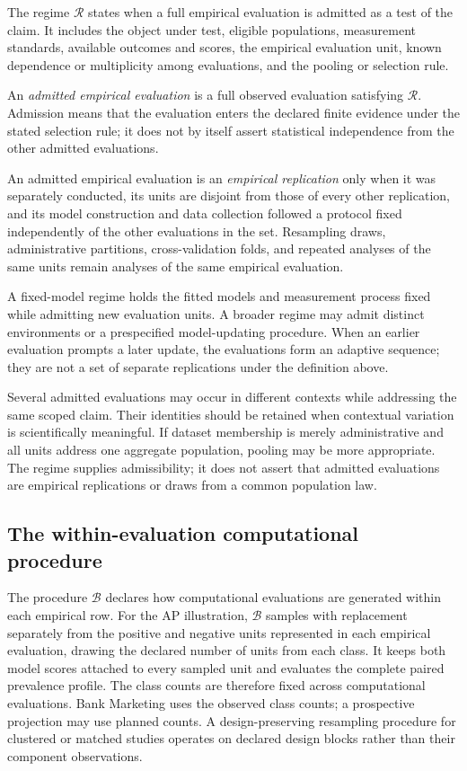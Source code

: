 \documentclass[11pt]{article}
\newcommand{\Regime}{\mathcal{R}}
\newcommand{\Boot}{\mathcal{B}}
\theoremstyle{remark}
\begin{document}
The regime $\Regime$ states when a full empirical evaluation is admitted as a
test of the claim. It includes the object under test, eligible populations,
measurement standards, available outcomes and scores, the empirical
evaluation unit, known dependence or multiplicity among evaluations, and the
pooling or selection rule.

An \emph{admitted empirical evaluation} is a full observed evaluation
satisfying $\Regime$. Admission means that the evaluation enters the declared
finite evidence under the stated selection rule; it does not by itself assert
statistical independence from the other admitted evaluations.

An admitted empirical evaluation is an \emph{empirical replication} only when
it was separately conducted, its units are disjoint from those of every other
replication, and its model construction and data collection followed a protocol
fixed independently of the other evaluations in the set. Resampling draws,
administrative partitions, cross-validation folds, and repeated analyses of the
same units remain analyses of the same empirical evaluation.

A fixed-model regime holds the fitted models and measurement process fixed
while admitting new evaluation units. A broader regime may admit distinct
environments or a prespecified model-updating procedure. When an earlier
evaluation prompts a later update, the evaluations form an adaptive sequence;
they are not a set of separate replications under the definition above.

Several admitted evaluations may occur in different contexts while addressing
the same scoped claim. Their identities should be retained when contextual
variation is scientifically meaningful. If dataset membership is merely
administrative and all units address one aggregate population, pooling may be
more appropriate. The regime supplies admissibility; it does not assert that
admitted evaluations are empirical replications or draws from a common
population law.

\subsection{The within-evaluation computational procedure}

The procedure $\Boot$ declares how computational evaluations are generated
within each empirical row. For the AP illustration, $\Boot$ samples with
replacement separately from the positive and negative units represented in
each empirical evaluation, drawing the declared number of units from each
class. It keeps both model scores attached to every sampled unit and evaluates
the complete paired prevalence profile. The class counts are therefore fixed
across computational evaluations. Bank Marketing uses the observed class
counts; a prospective projection may use planned counts. A design-preserving
resampling procedure for clustered or matched studies operates on declared
design blocks rather than their component observations.
\end{document}
